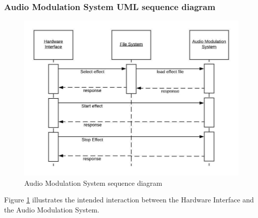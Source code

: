     \subsubsection{Audio Modulation System UML sequence diagram}
        \begin{figure}[!ht]
            \centering
            \includegraphics{diagrams/modulation-interaction.jpeg}
            \caption{Audio Modulation System sequence diagram}
            \label{fig:modulation}
        \end{figure}
        Figure \ref{fig:modulation} illustrates the intended interaction between the Hardware Interface and the Audio Modulation System.
        